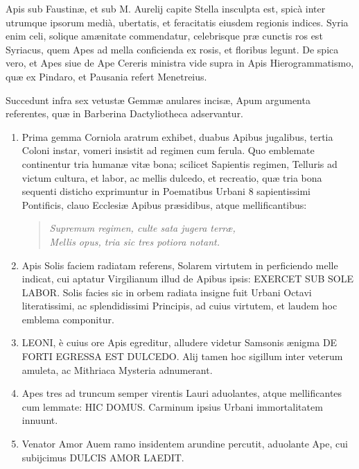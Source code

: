 \documentclass[a4paper, 11pt, oneside, polutonikogreek, latin]{article}
\begin{document}
Apis sub Faustinæ, et sub M. Aurelij capite Stella insculpta est, spicà inter utrumque ipsorum medià, ubertatis, et feracitatis eiusdem regionis indices. Syria enim celi, solique amænitate commendatur, celebrisque præ cunctis ros est Syriacus, quem Apes ad mella conficienda ex rosis, et floribus legunt. De spica vero, et Apes siue de Ape Cereris ministra vide supra in Apis Hierogrammatismo, quæ ex Pindaro, et Pausania refert Menetreius.

Succedunt infra sex vetustæ Gemmæ anulares incisæ, Apum argumenta referentes, quæ in Barberina Dactyliotheca adservantur.
\begin{enumerate}
    \item Prima gemma Corniola aratrum exhibet, duabus Apibus jugalibus, tertia Coloni instar, vomeri insistit ad regimen cum ferula. Quo emblemate continentur tria humanæ vitæ bona; scilicet Sapientis regimen, Telluris ad victum cultura, et labor, ac mellis dulcedo, et recreatio, quæ tria bona sequenti disticho exprimuntur in Poematibus Urbani 8 sapientissimi Pontificis, clauo Ecclesiæ Apibus præsidibus, atque mellificantibus:
    
    \begin{quote}
    \emph{Supremum regimen, culte sata jugera terræ,}\\
    \hspace*{10mm}\emph{Mellis opus, tria sic tres potiora notant.}\\
    \end{quote}
    
    \item Apis Solis faciem radiatam referens, Solarem virtutem in perficiendo melle indicat, cui aptatur Virgilianum illud de Apibus ipsis: EXERCET SUB SOLE LABOR. Solis facies sic in orbem radiata insigne fuit Urbani Octavi literatissimi, ac splendidissimi Principis, ad cuius virtutem, et laudem hoc emblema componitur.

    \item LEONI, è cuius ore Apis egreditur, alludere videtur Samsonis ænigma DE FORTI EGRESSA EST DULCEDO. Alij tamen hoc sigillum inter veterum amuleta, ac Mithriaca Mysteria adnumerant.

    \item Apes tres ad truncum semper virentis Lauri aduolantes, atque mellificantes cum lemmate: HIC DOMUS. Carminum ipsius Urbani immortalitatem innuunt.

    \item Venator Amor Auem ramo insidentem arundine percutit, aduolante Ape, cui subijcimus DULCIS AMOR LAEDIT.


\end{enumerate}
\end{document}
